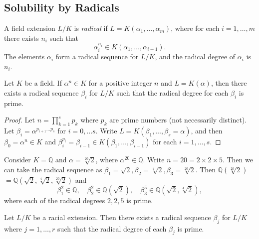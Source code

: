 \subsection{Solubility by Radicals}
\begin{definition} \label{def:radical-extension}
    A field extension $L / K$ is \textit{radical} if $L=K\left(\alpha_1, \ldots, \alpha_m\right)$, where for each $i=1, \ldots, m$ there exists $n_i$ such that
$$
\alpha_i^{n_i} \in K\left(\alpha_1, \ldots, \alpha_{i-1}\right).
$$
The elements $\alpha_i$ form a radical sequence for $L / K$, and the radical degree of $\alpha_i$ is $n_i$.
\end{definition}

\begin{theorem} \label{thm:radical-single-prime}
    Let $K$ be a field. If $\alpha ^ n \in K$ for a positive integer $n$ and  $L = K (\alpha)$, then there exists a radical sequence $\beta_i$ for $L / K$ such that the radical degree for each $\beta_i$ is prime.
\end{theorem}

\begin{proof}
    Let $n = \prod_{k=1}^{s} p_{k}$ where $p_{k}$ are prime numbers (not necessarily distinct). Let $\beta_{i} = \alpha^ {p_{i + 1} \dots  p_{s}}$ for $i = 0, \dots s$. Write $L = K(\beta_1,  \dots, \beta_s = \alpha)$, and then $\beta_0 = \alpha^n \in K$ and  $\beta_i ^ {p_i} = \beta_{i-1} \in K(\beta_1, \dots, \beta_{i - 1})$ for each $i  = 1, \dots, s$. 
\end{proof}

\begin{example}
    Consider $K  = \mathbb Q$ and $\alpha = \sqrt[20]{2}$, where $\alpha ^ {20} \in \mathbb Q$. Write $n = 20 =  2 \times 2 \times 5 $. Then we can take the radical sequence as $\beta_1 = \sqrt 2, \beta_2 = \sqrt[4]{2}, \beta_3 = \sqrt[20]{2}$. Then $\mathbb Q(\sqrt[20]{2}) $ $= \mathbb Q(\sqrt{2}, \sqrt[4]{2}, \sqrt[20]{2})$ and 
    $$
    \beta_1 ^ 2 \in \mathbb Q, \quad \beta_2 ^ 2 \in \mathbb Q(\sqrt{2}), \quad \beta_3^5 \in \mathbb Q (\sqrt{2}, \sqrt[4]{2}),
    $$
    where each of the radical degrees $2, 2, 5$ is prime.
\end{example}

\begin{theorem} \label{thm:radical-all-prime}
    Let $L / K$ be a racial extension. Then there exists a radical sequence $\beta_j$ for $L / K$ where $j=1, \dots, r$ such that the radical degree of each $\beta_j$ is prime.
\end{theorem}

